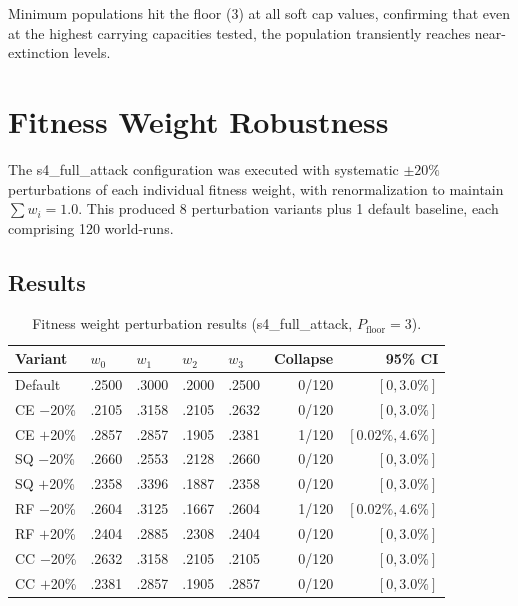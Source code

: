 \documentclass[11pt,a4paper]{article}
\begin{document}
Minimum populations hit the floor (3) at all soft cap values, confirming that even at the highest carrying capacities tested, the population transiently reaches near-extinction levels.

\section{Fitness Weight Robustness}\label{app:weight-robustness}

The s4\_full\_attack configuration was executed with systematic $\pm 20\%$ perturbations of each individual fitness weight, with renormalization to maintain $\sum w_i = 1.0$. This produced 8 perturbation variants plus 1 default baseline, each comprising 120 world-runs.

\subsection{Results}

\begin{table}[H]
\centering
\caption{Fitness weight perturbation results (s4\_full\_attack, $P_{\text{floor}} = 3$).}
\small
\begin{tabular}{@{}lllllrr@{}}
\toprule
Variant & $w_0$ & $w_1$ & $w_2$ & $w_3$ & Collapse & 95\% CI \\
\midrule
Default & .2500 & .3000 & .2000 & .2500 & 0/120 & $[0, 3.0\%]$ \\
CE $-$20\% & .2105 & .3158 & .2105 & .2632 & 0/120 & $[0, 3.0\%]$ \\
CE $+$20\% & .2857 & .2857 & .1905 & .2381 & 1/120 & $[0.02\%, 4.6\%]$ \\
SQ $-$20\% & .2660 & .2553 & .2128 & .2660 & 0/120 & $[0, 3.0\%]$ \\
SQ $+$20\% & .2358 & .3396 & .1887 & .2358 & 0/120 & $[0, 3.0\%]$ \\
RF $-$20\% & .2604 & .3125 & .1667 & .2604 & 1/120 & $[0.02\%, 4.6\%]$ \\
RF $+$20\% & .2404 & .2885 & .2308 & .2404 & 0/120 & $[0, 3.0\%]$ \\
CC $-$20\% & .2632 & .3158 & .2105 & .2105 & 0/120 & $[0, 3.0\%]$ \\
CC $+$20\% & .2381 & .2857 & .1905 & .2857 & 0/120 & $[0, 3.0\%]$ \\
\bottomrule
\end{tabular}
\end{table}
\end{document}
